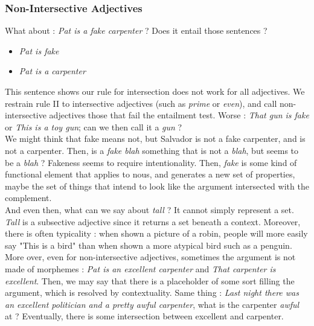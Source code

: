 \documentclass{cours}
\begin{document}
\subsubsection{Non-Intersective Adjectives}
What about : \textsl{Pat is a fake carpenter} ? Does it entail those sentences ?
\begin{itemize}
    \item \textsl{Pat is fake}
    \item \textsl{Pat is a carpenter}
\end{itemize}
This sentence shows our rule for intersection does not work for all adjectives. We restrain rule II to intersective adjectives (such as \textsl{prime} or \textsl{even}), and call non-intersective adjectives those that fail the entailment test. Worse : \textsl{That gun is fake} or \textsl{This is a toy gun}; can we then call it a \textsl{gun} ?\\
We might think that fake means not, but Salvador is not a fake carpenter, and is not a carpenter. Then, is a \textsl{fake blah} something that is not a \textsl{blah}, but seems to be a \textsl{blah} ? Fakeness seems to require intentionality. Then, \textsl{fake} is some kind of functional element that applies to nous, and generates a new set of properties, maybe the set of things that intend to look like the argument intersected with the complement.\\
And even then, what can we say about \textsl{tall} ? It cannot simply represent a set. \textsl{Tall} is a subsective adjective since it returns a set beneath a context. Moreover, there is often typicality : when shown a picture of a robin, people will more easily say "This is a bird" than when shown a more atypical bird such as a penguin.\\
More over, even for non-intersective adjectives, sometimes the argument is not made of morphemes : \textsl{Pat is an excellent carpenter} and \textsl{That carpenter is excellent}. Then, we may say that there is a placeholder of some sort filling the argument, which is resolved by contextuality. Same thing : \textsl{Last night there was an excellent politician and a pretty awful carpenter}, what is the carpenter \textsl{awful} at ? Eventually, there is some intersection between excellent and carpenter.
\end{document}
